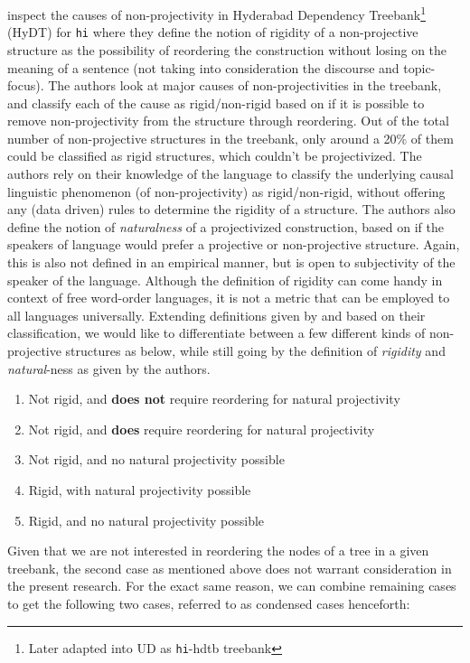 \cite{mannem2009insights} inspect the causes of non-projectivity in Hyderabad Dependency Treebank\footnote{Later adapted into UD as \texttt{hi}-hdtb treebank} (HyDT) for \verb|hi| where they define the notion of rigidity of a non-projective structure as the possibility of reordering the construction without losing on the meaning of a sentence (not taking into consideration the discourse and topic-focus). The authors look at major causes of non-projectivities in the treebank, and classify each of the cause as rigid/non-rigid based on if it is possible to remove non-projectivity from the structure through reordering. Out of the total number of non-projective structures in the treebank, only around a 20\% of them could be classified as rigid structures, which couldn't be projectivized. The authors rely on their knowledge of the language to classify the underlying causal linguistic phenomenon (of non-projectivity) as rigid/non-rigid, without offering any (data driven) rules to determine the rigidity of a structure. The authors also define the notion of \textit{naturalness} of a projectivized construction, based on if the speakers of language would prefer a projective or non-projective structure. Again, this is also not defined in an empirical manner, but is open to subjectivity of the speaker of the language. Although the definition of rigidity can come handy in context of free word-order languages, it is not a metric that can be employed to all languages universally. Extending definitions given by \citeauthor{mannem2009insights} and based on their classification, we would like to differentiate between a few different kinds of non-projective structures as below, while still going by the definition of \textit{rigidity} and \textit{natural}-ness as given by the authors.

\begin{enumerate}
    \item Not rigid, and \textbf{does not} require reordering for natural projectivity
    \item Not rigid, and \textbf{does} require reordering for natural projectivity
    \item Not rigid, and no natural projectivity possible
    \item Rigid, with natural projectivity possible
    \item Rigid, and no natural projectivity possible
\end{enumerate}

Given that we are not interested in reordering the nodes of a tree in a given treebank, the second case as mentioned above does not warrant consideration in the present research. For the exact same reason, we can combine remaining cases to get the following two cases, referred to as condensed cases henceforth:

